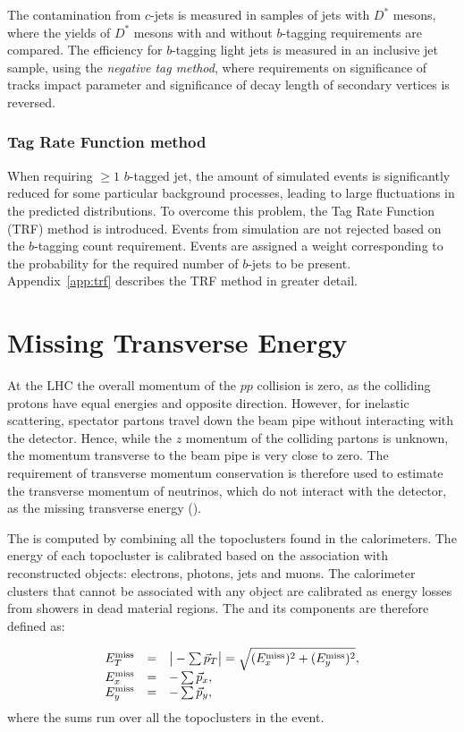 The contamination from $c$-jets is measured in samples of jets with
$D^*$ mesons, where the yields of $D^*$ mesons with and without
$b$-tagging requirements are compared.
The efficiency for $b$-tagging light jets is measured in an inclusive
jet sample, using the {\it negative tag method}, where requirements on
significance of tracks impact parameter and significance of decay 
length of secondary vertices is reversed.

\subsubsection{Tag Rate Function method}
\label{sec:trf}

When requiring $\geq 1$ $b$-tagged jet, the amount of simulated events
is significantly reduced for some particular background
processes, leading to large fluctuations in the predicted distributions.
To overcome this problem, the Tag Rate Function (TRF) method is introduced.
Events from simulation are not rejected based on the $b$-tagging count
requirement. Events are assigned a weight corresponding to the
probability for the required number of $b$-jets to be present.
Appendix~\ref{app:trf} describes the TRF method in greater detail.

\section{Missing Transverse Energy}
\label{sec:met}

At the LHC the overall momentum of the $pp$ collision is zero, as the
colliding protons have equal energies and opposite direction. 
However, for inelastic scattering, spectator partons travel down the
beam pipe without interacting with the detector. Hence, while the $z$
momentum of the colliding partons is unknown, the momentum transverse
to the beam pipe is very close to zero. The requirement of transverse
momentum conservation is therefore used to estimate the transverse
momentum of neutrinos, which do not interact with the detector, as the
missing transverse energy (\met{}).  

The \met{} is computed by combining all the topoclusters found in the
calorimeters. The energy of each topocluster is calibrated based on
the association with reconstructed objects: electrons, photons, jets
and muons. The calorimeter clusters that cannot be associated with any
object are calibrated as energy losses from showers in dead material
regions. The \met{} and its components are therefore defined as:

\begin{equation}\label{eq:met}
\begin{array}{lcl}
E^{\rm miss}_{T} & = & \big|-\sum\vec{p}_T \big| = \sqrt{(E^{\rm miss}_{x})^2 + (E^{\rm miss}_{y})^2} ,\\
E^{\rm miss}_{x} & = & -\sum\vec{p}_x ,\\
E^{\rm miss}_{y} & = & -\sum\vec{p}_y ,\\
\end{array}	\end{equation}
where the sums run over all the topoclusters in the event.
